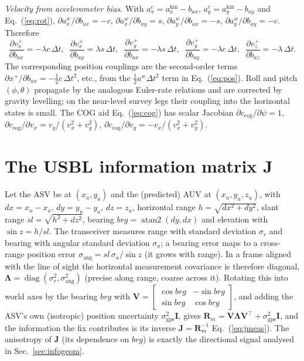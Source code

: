 \documentclass[12pt,a4paper,oneside]{book}
\newcommand{\eqnref}[1]{Eq.~(\ref{#1})}
\newcommand{\secref}[1]{Sec.~\ref{#1}}
\begin{document}
\emph{Velocity from accelerometer bias.} With $a_x^c=a_x^{\text{kin}}-b_{ax}$, $a_y^c=a_y^{\text{kin}}-b_{ay}$
and \eqnref{eq:rot}, $\partial a_x^w/\partial b_{ax}=-c$, $\partial a_x^w/\partial b_{ay}=s$,
$\partial a_y^w/\partial b_{ax}=-s$, $\partial a_y^w/\partial b_{ay}=-c$. Therefore
\begin{equation}
\frac{\partial v_x^{+}}{\partial b_{ax}}=-\lambda c\,\Delta t,\;\;
\frac{\partial v_x^{+}}{\partial b_{ay}}= \lambda s\,\Delta t,\;\;
\frac{\partial v_y^{+}}{\partial b_{ax}}=-\lambda s\,\Delta t,\;\;
\frac{\partial v_y^{+}}{\partial b_{ay}}=-\lambda c\,\Delta t,\;\;
\frac{\partial v_z^{+}}{\partial b_{az}}=-\lambda\,\Delta t .
\end{equation}
The corresponding position couplings are the second-order terms
$\partial x^{+}/\partial b_{ax}=-\tfrac12 c\,\Delta t^{2}$, etc., from the $\tfrac12 a^w\Delta t^2$ term in
\eqnref{eq:pos}. Roll and pitch $(\phi,\theta)$ propagate by the analogous Euler-rate relations and are
corrected by gravity levelling; on the near-level survey legs their coupling into the horizontal states is
small. The COG aid \eqnref{eq:cog} has scalar Jacobian $\partial c_{\text{cog}}/\partial\psi=1$,
$\partial c_{\text{cog}}/\partial v_x=v_y/(v_x^2+v_y^2)$, $\partial c_{\text{cog}}/\partial v_y=-v_x/(v_x^2+v_y^2)$.

\section{The USBL information matrix $\mathbf{J}$}
\label{app:J}
Let the ASV be at $(x_a,y_a)$ and the (predicted) AUV at $(x_u,y_u,z_u)$, with $dx=x_u-x_a$, $dy=y_u-y_a$,
$dz=z_u$, horizontal range $h=\sqrt{dx^2+dy^2}$, slant range $sl=\sqrt{h^2+dz^2}$, bearing
$brg=\operatorname{atan2}(dy,dx)$ and elevation with $\sin z=h/sl$. The transceiver measures range with
standard deviation $\sigma_r$ and bearing with angular standard deviation $\sigma_a$; a bearing error maps
to a cross-range position error $\sigma_{\text{ang}}=sl\,\sigma_a/\sin z$ (it grows with range). In a frame
aligned with the line of sight the horizontal measurement covariance is therefore diagonal,
$\boldsymbol{\Lambda}=\operatorname{diag}(\sigma_r^2,\sigma_{\text{ang}}^2)$ (precise along range, coarse
across it). Rotating this into world axes by the bearing $brg$ with
$\mathbf{V}=\left[\begin{smallmatrix}\cos brg&-\sin brg\\ \sin brg&\cos brg\end{smallmatrix}\right]$, and
adding the ASV's own (isotropic) position uncertainty $\sigma_{\text{gps}}^2\mathbf{I}$, gives
$\mathbf{R}_m=\mathbf{V}\boldsymbol{\Lambda}\mathbf{V}^{\!\top}+\sigma_{\text{gps}}^2\mathbf{I}$, and the
information the fix contributes is its inverse $\mathbf{J}=\mathbf{R}_m^{-1}$ \eqnref{eq:jmeas}. The
anisotropy of $\mathbf{J}$ (its dependence on $brg$) is exactly the directional signal analysed in
\secref{sec:infogeom}.
\end{document}
